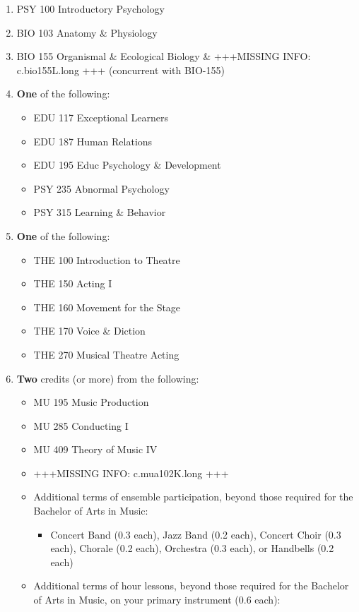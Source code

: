 \documentclass[
  letterpaper,
]{scrbook}
\providecommand{\tightlist}{%
  \setlength{\itemsep}{0pt}\setlength{\parskip}{0pt}}
\begin{document}
\begin{enumerate}
\def\labelenumi{\arabic{enumi}.}
\tightlist
\item
  PSY 100 Introductory Psychology
\item
  BIO 103 Anatomy \& Physiology
\item
  BIO 155 Organismal \& Ecological Biology \& +++MISSING INFO:
  c.bio155L.long +++ (concurrent with BIO-155)
\item
  \textbf{One} of the following:

  \begin{itemize}
  \tightlist
  \item
    EDU 117 Exceptional Learners
  \item
    EDU 187 Human Relations
  \item
    EDU 195 Educ Psychology \& Development
  \item
    PSY 235 Abnormal Psychology
  \item
    PSY 315 Learning \& Behavior
  \end{itemize}
\item
  \textbf{One} of the following:

  \begin{itemize}
  \tightlist
  \item
    THE 100 Introduction to Theatre
  \item
    THE 150 Acting I
  \item
    THE 160 Movement for the Stage
  \item
    THE 170 Voice \& Diction
  \item
    THE 270 Musical Theatre Acting
  \end{itemize}
\item
  \textbf{Two} credits (or more) from the following:

  \begin{itemize}
  \tightlist
  \item
    MU 195 Music Production
  \item
    MU 285 Conducting I
  \item
    MU 409 Theory of Music IV
  \item
    +++MISSING INFO: c.mua102K.long +++
  \item
    Additional terms of ensemble participation, beyond those required
    for the Bachelor of Arts in Music:

    \begin{itemize}
    \tightlist
    \item
      Concert Band (0.3 each), Jazz Band (0.2 each), Concert Choir (0.3
      each), Chorale (0.2 each), Orchestra (0.3 each), or Handbells (0.2
      each)
    \end{itemize}
  \item
    Additional terms of hour lessons, beyond those required for the
    Bachelor of Arts in Music, on your primary instrument (0.6 each):


\end{itemize}
\end{enumerate}
\end{document}
